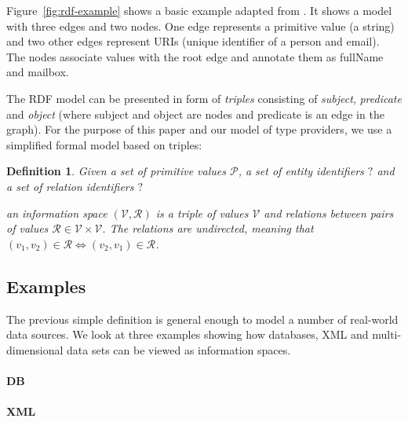 \documentclass[10pt]{sigplanconf}
\newtheorem{definition}{Definition}
\newcommand{\ident}[1]{\textnormal{\sffamily #1}}
\begin{document}
Figure~\ref{fig:rdf-example} shows a basic example adapted from \cite{semweb-rdf}. It shows a model
with three edges and two nodes. One edge represents a primitive value (a string) and two 
other edges represent URIs (unique identifier of a person and email). The nodes associate values
with the root edge and annotate them as \ident{fullName} and \ident{mailbox}. 
%

The RDF model can be presented in form of \emph{triples} consisting of \emph{subject},
\emph{predicate} and \emph{object} (where subject and object are nodes and predicate
is an edge in the graph). For the purpose of this paper and our model of type providers, 
we use a simplified formal model based on triples:

\newcommand{\iprim}{\mathcal{P}}
\newcommand{\calv}{\mathcal{V}}
\newcommand{\calr}{\mathcal{R}}

\begin{definition}
Given a set of primitive values $\iprim$, a set of entity identifiers $?$ and a
set of relation identifiers $?$

an \emph{information space} $(\calv, \calr)$ is a triple of values $\calv$ and relations between
pairs of values $\calr \in \calv \times \calv$. The relations are undirected, meaning that 
$(v_1, v_2) \in \calr \Leftrightarrow (v_2, v_1) \in \calr$. 
\end{definition}

\subsection{Examples} 
The previous simple definition is general enough to model a number of real-world data sources.
We look at three examples showing how databases, XML and multi-dimensional data sets 
can be viewed as information spaces.

\paragraph{DB}

\paragraph{XML}



\newpage
~
\newpage



\end{document}

